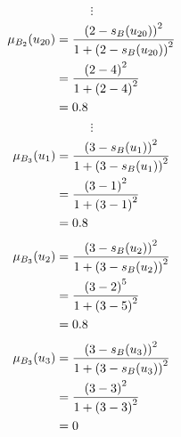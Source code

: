 \documentclass[a4paper]{book}
\begin{document}
				\[
					\vdots
				\]
				\begin{align}
					\mu_{B_2}(u_{20}) &= \frac{\left(2-s_B(u_{20})\right)^2}{1 + \left(2-s_B(u_{20})\right)^2}\\
					&= \frac{\left(2-4\right)^2}{1 + \left(2-4\right)^2} \notag \\
					&= 0.8 \notag
				\end{align}
				\[
					\vdots
				\]
				\begin{align}
					\mu_{B_3}(u_1) &= \frac{\left(3-s_B(u_1)\right)^2}{1 + \left(3-s_B(u_1)\right)^2}\\
					&= \frac{\left(3-1\right)^2}{1 + \left(3-1\right)^2} \notag \\
					&= 0.8 \notag
				\end{align}
				\begin{align}
					\mu_{B_3}(u_2) &= \frac{\left(3-s_B(u_2)\right)^2}{1 + \left(3-s_B(u_2)\right)^2}\\
					&= \frac{\left(3-2\right)^5}{1 + \left(3-5\right)^2} \notag \\
					&= 0.8 \notag
				\end{align}
				\begin{align}
					\mu_{B_3}(u_3) &= \frac{\left(3-s_B(u_3)\right)^2}{1 + \left(3-s_B(u_3)\right)^2}\\
					&= \frac{\left(3-3\right)^2}{1 + \left(3-3\right)^2} \notag \\
					&= 0 \notag
				\end{align}
\end{document}

